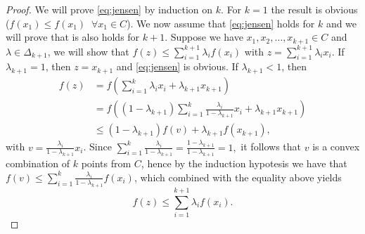 \documentclass[10pt,a4paper]{article}
\begin{document}
\begin{proof}
	We will prove \eqref{eq:jensen} by induction on $k$. For $k=1$ the result is obvious ($f(x_1)\leq f(x_1)\;\;\forall x_1 \in C$). We now assume that \eqref{eq:jensen} holds for $k$ and we will prove that is also holds for $k+1$. Suppose we have $x_1, x_2, \dots, x_{k+1} \in C$ and $\lambda\in \Delta_{k+1}$, we will show that $f(z)\leq \sum_{i=1}^{k+1} \lambda_i f(x_i)$ with $z=\sum_{i=1}^{k+1} \lambda_i x_i$. If $\lambda_{k+1} =1$, then $z=x_{k+1}$ and \eqref{eq:jensen} is obvious. If $\lambda_{k+1}<1$, then
	\begin{equation*}
		\begin{split}
			f(z)& = f\left(\sum_{i=1}^k \lambda_i x_i + \lambda_{k+1}x_{k+1} \right)\\
			&= f\left((1-\lambda_{k+1})\sum_{i=1}^k \frac{\lambda_i}{1-\lambda_{k+1}} x_i + \lambda_{k+1}x_{k+1} \right)\\
			&\leq (1-\lambda_{k+1})f(v) + \lambda_{k+1} f(x_{k+1}),
		\end{split}
	\end{equation*}
with $v= \frac{\lambda_i}{1-\lambda_{k+1}} x_i$. Since $\sum_{i=1}^k\frac{\lambda_i}{1-\lambda_{k+1}} = \frac{1-\lambda_{k+1}}{1-\lambda_{k+1}} = 1,$ it follows that $v$ is a convex combination of $k$ points from $C$, hence by the induction hypotesis we have that $f(v)\leq \sum_{i=1}^k\frac{\lambda_i}{1-\lambda_{k+1}} f(x_i)$, which combined with the equality above yields
\begin{equation*}
	f(z) \leq \sum_{i=1}^{k+1} \lambda_i f(x_i).
\end{equation*}
\end{proof}
\end{document}
